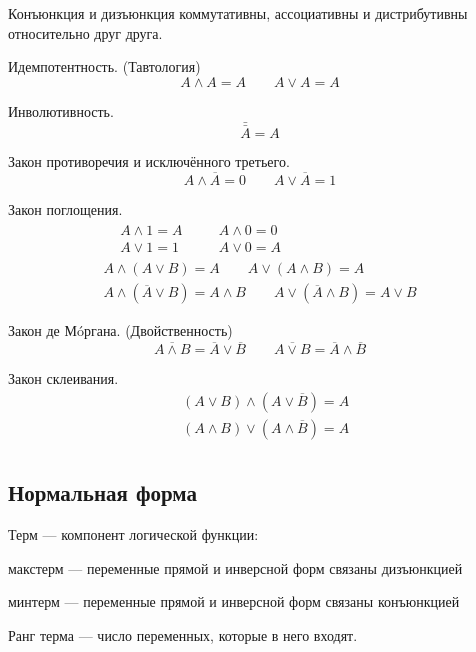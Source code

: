 Конъюнкция и дизъюнкция {\ital коммутативны}, {\ital ассоциативны} и {\ital дистрибутивны} относительно друг друга.
\begin{theorem}
{\bold Идемпотентность.} {\ital\color{desc} (Тавтология)}
$$A\land A=A\qquad A\lor A=A$$
\end{theorem}
\begin{theorem}
{\bold Инволютивность.}
$$\bar{\bar{A}}=A$$
\end{theorem}
\begin{theorem}
{\bold Закон противоречия} и {\bold исключённого третьего.}
$$A\land\overline{A}=0\qquad A\lor\overline{A}=1$$
\end{theorem}
\begin{theorem}
{\bold Закон поглощения.}
$$\begin{gathered}\begin{aligned}
&A\land 1=A &\quad &A\land 0=0\\
&A\lor 1=1 &\quad &A\lor 0=A
\end{aligned}\\
A\land (A\lor B)=A\qquad A\lor (A\land B)=A\\
A\land (\overline{A}\lor B)=A\land B\qquad A\lor (\overline{A}\land B)=A\lor B\end{gathered}$$
\end{theorem}
\begin{theorem}
{\bold Закон де Мóргана.} {\ital\color{desc} (Двойственность)}
$$\overline{A\land B}=\overline{A}\lor\overline{B}\qquad\overline{A\lor B}=\overline{A}\land\overline{B}$$
\end{theorem}
\begin{theorem}
{\bold Закон склеивания.}
$$\begin{aligned}
&(A\lor B)\land(A\lor \overline{B})=A\\
&(A\land B)\lor(A\land \overline{B})=A\\
\end{aligned}$$
\end{theorem}

\subsection{Нормальная форма}

{\bold Терм} --- компонент логической функции:

\begin{list*}
\item{\bold макстерм} --- переменные прямой и инверсной форм связаны {\ital дизъюнкцией}
\item{\bold минтерм} --- переменные прямой и инверсной форм связаны {\ital конъюнкцией}
\end{list*}
{\bold Ранг} {\ital терма} --- число переменных, которые в него входят.

